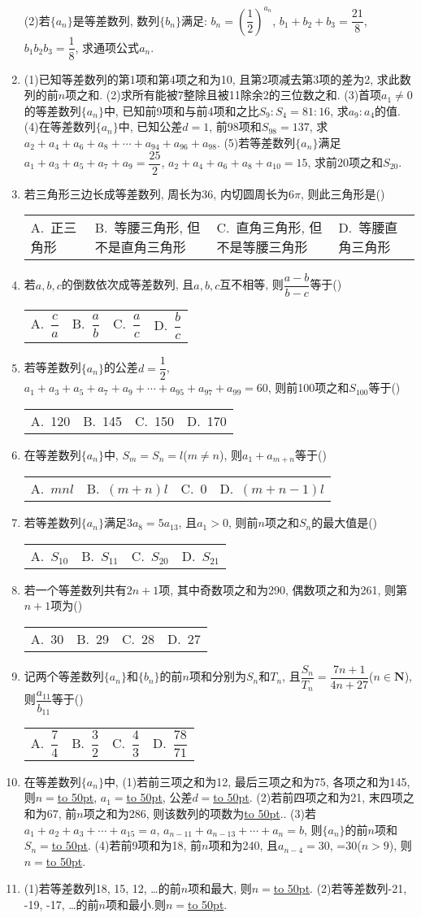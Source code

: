 \documentclass[10pt,a4paper]{article}
\newcommand{\blank}[1]{\underline{\hbox to #1pt{}}}
\newcommand{\fourch}[4]{\par\begin{tabular}{p{.23\textwidth}p{.23\textwidth}p{.23\textwidth}p{.23\textwidth}}
A.~#1 &B.~#2& C.~#3& D.~#4
\end{tabular}}
\begin{document}
\begin{enumerate}[1.]
(2)若$\{a_n\}$是等差数列, 数列$\{b_n\}$满足: $b_n=(\dfrac 12)^{a_n}$, $b_1+b_2+b_3=\dfrac{21}8$, $b_1b_2b_3=\dfrac 18$, 求通项公式$a_n$.
\item (1)已知等差数列的第1项和第4项之和为10, 且第2项减去第3项的差为2, 求此数列的前$n$项之和.
(2)求所有能被7整除且被11除余2的三位数之和.
(3)首项$a_1\ne 0$的等差数列$\{a_n\}$中, 已知前9项和与前4项和之比$S_9:S_4=81:16$, 求$a_9:a_4$的值.
(4)在等差数列$\{a_n\}$中, 已知公差$d=1$, 前98项和$S_{98}=137$, 求$a_2+a_4+a_6+a_8+\cdots +a_{94}+a_{96}+a_{98}$.
(5)若等差数列$\{a_n\}$满足$a_1+a_3+a_5+a_7+a_9=\dfrac{25}2$, $a_2+a_4+a_6+a_8+a_{10}=15$, 求前20项之和$S_{20}$.
\item 若三角形三边长成等差数列, 周长为36, 内切圆周长为$6\pi$, 则此三角形是()
\fourch{正三角形}{等腰三角形, 但不是直角三角形}{直角三角形, 但不是等腰三角形}{等腰直角三角形}
\item 若$a,b,c$的倒数依次成等差数列, 且$a,b,c$互不相等, 则$\dfrac{a-b}{b-c}$等于()
\fourch{$\dfrac ca$}{$\dfrac ab$}{$\dfrac ac$}{$\dfrac bc$}
\item 若等差数列$\{a_n\}$的公差$d=\dfrac 12$, $a_1+a_3+a_5+a_7+a_9+\cdots +a_{95}+a_{97}+a_{99}=60$, 则前100项之和$S_{100}$等于()
\fourch{120}{145}{150}{170}
\item 在等差数列$\{a_n\}$中, $S_m=S_n=l$($m\ne n$), 则$a_1+a_{m+n}$等于()
\fourch{$mnl$}{$(m+n)l$}{0}{$(m+n-1)l$}
\item 若等差数列$\{a_n\}$满足$3a_8=5a_{13}$, 且$a_1>0$, 则前$n$项之和$S_n$的最大值是()
\fourch{$S_{10}$}{$S_{11}$}{$S_{20}$}{$S_{21}$}
\item 若一个等差数列共有$2n+1$项, 其中奇数项之和为290, 偶数项之和为261, 则第$n+1$项为()
\fourch{30}{29}{28}{27}
\item 记两个等差数列$\{a_n\}$和$\{b_n\}$的前$n$项和分别为$S_n$和$T_n$, 且$\dfrac{S_n}{T_n}=\dfrac{7n+1}{4n+27}$($n\in \mathbf{N}$), 则$\dfrac{{a_{11}}}{{b_{11}}}$等于()
\fourch{$\dfrac 74$}{$\dfrac 32$}{$\dfrac 43$}{$\dfrac{78}{71}$}
\item 在等差数列$\{a_n\}$中,
(1)若前三项之和为12, 最后三项之和为75, 各项之和为145, 则$n=$\blank{50}, $a_1=$\blank{50}, 公差$d=$\blank{50}.
(2)若前四项之和为21, 末四项之和为67, 前$n$项之和为286, 则该数列的项数为\blank{50}..
(3)若$a_1+a_2+a_3+\cdots +a_{15}=a$, $a_{n-11}+a_{n-13}+\cdots +a_n=b$, 则$\{a_n\}$的前$n$项和$S_n=$\blank{50}.
(4)若前9项和为18, 前$n$项和为240, 且$a_{n-4}=30$, =30($n>9$), 则$n=$\blank{50}.
\item (1)若等差数列18, 15, 12, …的前$n$项和最大, 则$n=$\blank{50}.
(2)若等差数列-21, -19, -17, …的前$n$项和最小.则$n=$\blank{50}.

\end{enumerate}
\end{document}
